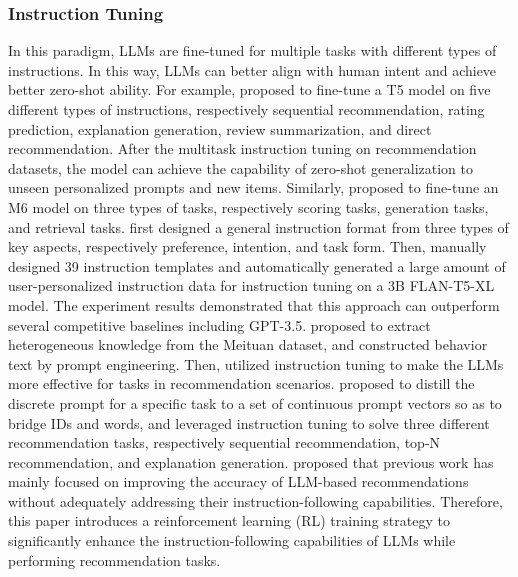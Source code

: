 \documentclass[sn-mathphys-num]{sn-jnl}%
\theoremstyle{thmstyleone}%
\theoremstyle{thmstyletwo}%
\theoremstyle{thmstylethree}%
\begin{document}
\subsubsection{Instruction Tuning}
In this paradigm, LLMs are fine-tuned for multiple tasks with different types of instructions. In this way, LLMs can better align with human intent and achieve better zero-shot ability. For example, \cite{DBLP:conf/recsys/Geng0FGZ22} proposed to fine-tune a T5 model on five different types of instructions, respectively sequential recommendation, rating prediction, explanation generation, review summarization, and direct recommendation. After the multitask instruction tuning on recommendation datasets, the model can achieve the capability of zero-shot generalization to unseen personalized prompts and new items. Similarly, \cite{DBLP:journals/corr/abs-2205-08084} proposed to fine-tune an M6 model on three types of tasks, respectively scoring tasks, generation tasks, and retrieval tasks. \cite{DBLP:journals/corr/abs-2305-07001} first designed a general instruction format from three types of key aspects, respectively preference, intention, and task form. Then, \cite{DBLP:journals/corr/abs-2305-07001} manually designed 39 instruction templates and automatically generated a large amount of user-personalized instruction data for instruction tuning on a 3B FLAN-T5-XL model. The experiment results demonstrated that this approach can outperform several competitive baselines including GPT-3.5. \cite{yin2023heterogeneous} proposed to extract heterogeneous knowledge from the Meituan dataset, and constructed behavior text by prompt engineering. Then, \cite{yin2023heterogeneous} utilized instruction tuning to make the LLMs more effective for tasks in recommendation scenarios. \cite{li2023prompt} proposed to distill the discrete prompt for a specific task to a set of continuous prompt vectors so as to bridge IDs and words, and \cite{li2023prompt} leveraged instruction tuning to solve three different recommendation tasks, respectively sequential recommendation, top-N recommendation, and explanation generation. \cite{lu2024aligning} proposed that previous work has mainly focused on improving the accuracy of LLM-based recommendations without adequately addressing their instruction-following capabilities. Therefore, this paper introduces a reinforcement learning (RL) training strategy to significantly enhance the instruction-following capabilities of LLMs while performing recommendation tasks.
\end{document}

